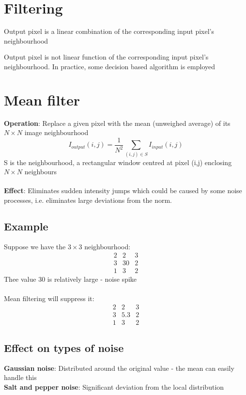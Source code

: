 \documentclass{article}[18pt]
\begin{document}
\section{Filtering}
\begin{defin}
Output pixel is a linear combination of the corresponding input pixel's neighbourhood
\end{defin}
\begin{defin}
Output pixel is not linear function of the corresponding input pixel's neighbourhood. In practice, some decision based algorithm is employed
\end{defin}
\section{Mean filter}
\textbf{Operation}: Replace a given pixel with the mean (unweighed average) of its $N\times N$ image neighbourhood
\[
I_{o u t p u t}(i, j)=\frac{1}{N^{2}} \sum_{(i, j) \in S} I_{i n p u t}(i, j)
\]
S is the neighbourhood, a rectangular window centred at pixel (i,j) enclosing $N\times N$ neighbours\\
\\
\textbf{Effect}: Eliminates sudden intensity jumps which could be caused by some noise processes, i.e. eliminates large deviations from the norm.
\subsection{Example}
Suppose we have the $3\times 3$ neighbourhood:
\[
\begin{array}{lll}{2} & {2} & {3} \\ {3} & {30} & {2} \\ {1} & {3} & {2}\end{array}
\]
Thee value 30 is relatively large - noise spike\\
\\
Mean filtering will suppress it:
\[
\begin{array}{lll}{2} & {2} & {3} \\ {3} & {5.3} & {2} \\ {1} & {3} & {2}\end{array}
\]
\subsection{Effect on types of noise}
\textbf{Gaussian noise}: Distributed around the original value - the mean can easily handle this\\
\textbf{Salt and pepper noise}: Significant deviation from the local distribution
\end{document}
